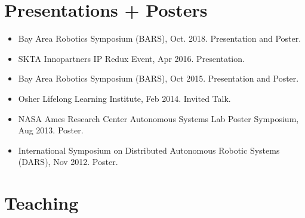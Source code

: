 \documentclass[letterpaper]{deedy-resume} %
\begin{document}

\section{Presentations + Posters}

\vspace{0.2cm}
\begin{itemize}

\item {} Bay Area Robotics Symposium (BARS), Oct. 2018. Presentation and Poster.

\item {} SKTA Innopartners IP Redux Event, Apr 2016. Presentation.

\item {} Bay Area Robotics Symposium (BARS), Oct 2015. Presentation and Poster.
  
\item {} Osher Lifelong Learning Institute, Feb 2014. Invited Talk.

\item {} NASA Ames Research Center Autonomous Systems Lab Poster Symposium, Aug 2013. Poster.

\item {} International Symposium on Distributed Autonomous Robotic Systems (DARS), Nov 2012. Poster.

\end{itemize}



\section{Teaching}

\vspace{0.2cm}

\end{document}
